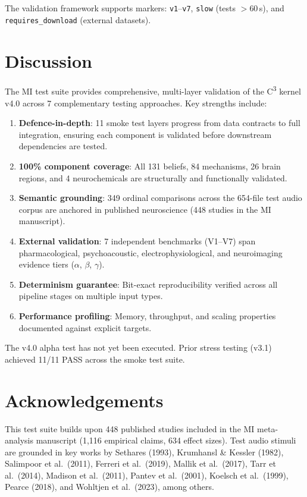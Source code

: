 \documentclass[10pt,twocolumn]{article}
\newcommand{\Cthree}{C\textsuperscript{3}}
\begin{document}
The validation framework supports markers: \texttt{v1}--\texttt{v7}, \texttt{slow} (tests $> 60$\,s), and \texttt{requires\_download} (external datasets).

\section{Discussion}
\label{sec:discussion}

The MI test suite provides comprehensive, multi-layer validation of the \Cthree{} kernel v4.0 across 7 complementary testing approaches. Key strengths include:

\begin{enumerate}[nosep,leftmargin=*]
  \item \textbf{Defence-in-depth}: 11 smoke test layers progress from data contracts to full integration, ensuring each component is validated before downstream dependencies are tested.
  \item \textbf{100\% component coverage}: All 131 beliefs, 84 mechanisms, 26 brain regions, and 4 neurochemicals are structurally and functionally validated.
  \item \textbf{Semantic grounding}: 349 ordinal comparisons across the 654-file test audio corpus are anchored in published neuroscience (448 studies in the MI manuscript).
  \item \textbf{External validation}: 7 independent benchmarks (V1--V7) span pharmacological, psychoacoustic, electrophysiological, and neuroimaging evidence tiers ($\alpha$, $\beta$, $\gamma$).
  \item \textbf{Determinism guarantee}: Bit-exact reproducibility verified across all pipeline stages on multiple input types.
  \item \textbf{Performance profiling}: Memory, throughput, and scaling properties documented against explicit targets.
\end{enumerate}

The v4.0 alpha test has not yet been executed. Prior stress testing (v3.1) achieved 11/11 PASS across the smoke test suite.

\section*{Acknowledgements}

\noindent
This test suite builds upon 448 published studies included in the MI meta-analysis manuscript (1,116 empirical claims, 634 effect sizes). Test audio stimuli are grounded in key works by Sethares (1993), Krumhansl \& Kessler (1982), Salimpoor et al.\ (2011), Ferreri et al.\ (2019), Mallik et al.\ (2017), Tarr et al.\ (2014), Madison et al.\ (2011), Pantev et al.\ (2001), Koelsch et al.\ (1999), Pearce (2018), and Wohltjen et al.\ (2023), among others.
\end{document}
